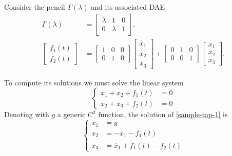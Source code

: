 \begin{example} \label{exmp:dae-l2}
    Consider the pencil \(\Gamma(\lambda)\) and its associated DAE
    \begin{align*}
        \Gamma(\lambda) &=
        \begin{bmatrix}
            \lambda & 1 & 0 \\
            0 & \lambda & 1
        \end{bmatrix}, \\
        \begin{bmatrix}
            f_{1}(t) \\
            f_{2}(t)
        \end{bmatrix} &=
        \begin{bmatrix}
            1 & 0 & 0 \\
            0 & 1 & 0
        \end{bmatrix}
        \begin{bmatrix}
            \dot{x_{1}} \\
            \dot{x_{2}} \\
            \dot{x_{3}}
        \end{bmatrix}
        + \begin{bmatrix}
            0 & 1 & 0 \\
            0 & 0 & 1
        \end{bmatrix}
        \begin{bmatrix}
            x_{1} \\
            x_{2} \\
            x_{3}
        \end{bmatrix}.
    \end{align*}

    To compute its solutions we must solve the linear system
    \begin{equation} \label{sample-tap-1}
        \left\{
        \begin{aligned}
            \dot{x_{1}} + x_{2} + f_{1}(t) & = 0 \\
            \dot{x_{2}} + x_{3} + f_{2}(t) & = 0
        \end{aligned}
        \right.
    \end{equation}
    Denoting with \(g\) a generic \(C^2\) function, the solution of \eqref{sample-tap-1} is
    \begin{equation*}
        \left\{
            \begin{aligned}
                x_{1} &= g \\
                x_{2} &= -\dot{x_{1}} -f_{1}(t) \\
                x_{3} &= \ddot{x_{1}} + \dot{f_{1}}(t) - f_{2}(t)
            \end{aligned}
        \right.
    \end{equation*}
\end{example}

